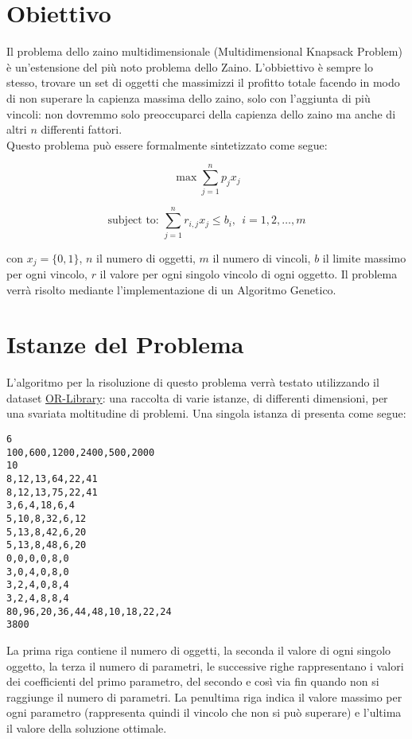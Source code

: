\section{Obiettivo}
Il problema dello zaino multidimensionale (Multidimensional Knapsack Problem) è
un'estensione del più noto problema dello Zaino. L'obbiettivo è sempre lo
stesso, trovare un set di oggetti che massimizzi il profitto totale facendo in
modo di non superare la capienza massima dello zaino, solo con l'aggiunta di più
vincoli: non dovremmo solo preoccuparci della capienza dello zaino ma anche di
altri $n$ differenti fattori.\\

Questo problema può essere formalmente sintetizzato come segue:

\[
    \max \sum_{j=1}^{n} p_j x_j
\]

\[
    \text{subject to: } \sum_{j=1}^{n} r_{i,j} x_j \leq b_i, \ \ i = 1,2,\ldots, m
\]

con $x_j = \{0, 1\}$, $n$ il numero di oggetti, $m$ il numero di vincoli, $b$ il limite massimo per ogni vincolo,
$r$ il valore per ogni singolo vincolo di ogni oggetto.
Il problema verrà risolto mediante l'implementazione di un Algoritmo Genetico.

\section{Istanze del Problema}

L'algoritmo per la risoluzione di questo problema verrà testato utilizzando il dataset
\href{http://people.brunel.ac.uk/~mastjjb/jeb/orlib/mknapinfo.html}{OR-Library}: una
raccolta di varie istanze, di differenti dimensioni, per una svariata moltitudine di
problemi. Una singola istanza di presenta come segue:

\begin{lstlisting}[caption={Esempio di Istanza di un problema MKP con 6 oggetti e 10 vincoli.}]
6
100,600,1200,2400,500,2000
10
8,12,13,64,22,41
8,12,13,75,22,41
3,6,4,18,6,4
5,10,8,32,6,12
5,13,8,42,6,20
5,13,8,48,6,20
0,0,0,0,8,0
3,0,4,0,8,0
3,2,4,0,8,4
3,2,4,8,8,4
80,96,20,36,44,48,10,18,22,24
3800
\end{lstlisting}

La prima riga contiene il numero di oggetti, la seconda il valore di ogni singolo
oggetto, la terza il numero di parametri, le successive righe rappresentano i
valori dei coefficienti del primo parametro, del secondo e così via fin quando non si raggiunge il
numero di parametri. La penultima riga indica il valore massimo per ogni parametro (rappresenta quindi
il vincolo che non si può superare) e
l'ultima il valore della soluzione ottimale.

